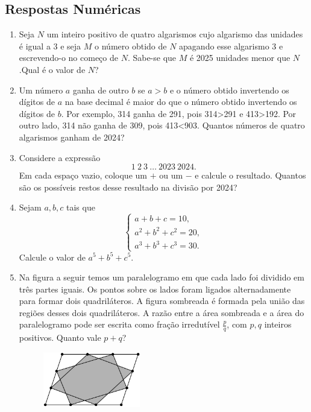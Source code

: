 \documentclass[12pt]{article}
\begin{document}
    \subsection{Respostas Numéricas}
      \begin{enumerate}[label=\textbf{\arabic*.}, start=16]
        \item Seja \(N\) um inteiro positivo de quatro algarismos cujo algarismo das unidades é igual a 3 e seja \(M\) o número obtido de
          \(N\) apagando esse algarismo 3 e escrevendo-o no começo de \(N\). Sabe-se que \(M\) é 2025 unidades menor que \(N\).Qual é o valor
          de \(N\)?
        \item Um número \(a\) ganha de outro \(b\) se \(a>b\) e o número obtido invertendo os dígitos de \(a\) na base decimal é maior do que
          o número obtido invertendo os dígitos de \(b\). Por exemplo, 314 ganha de 291, pois 314>291 e 413>192. Por outro lado, 314 não ganha
          de 309, pois 413<903. Quantos números de quatro algarismos ganham de 2024?
        \item Considere a expressão
          \[
            1\ 2\ 3\ \ldots\ 2023\ 2024.
          \]
          Em cada espaço vazio, coloque um \(+\) ou um \(-\) e calcule o resultado. Quantos são os possíveis restos desse resultado na
          divisão por 2024?
        \item Sejam \(a,b,c\) tais que
          \[
            \begin{cases}
              a+b+c=10,\\
              a^2+b^2+c^2=20,\\
              a^3+b^3+c^3=30.
            \end{cases}
          \]
          Calcule o valor de \(a^5+b^5+c^5\).
        \item Na figura a seguir temos um paralelogramo em que cada lado foi dividido em três partes iguais. Os pontos sobre os lados foram
          ligados alternadamente para formar dois quadriláteros. A figura sombreada é formada pela união das regiões desses dois quadriláteros.
          A razão entre a área sombreada e a área do paralelogramo pode ser escrita como fração irredutível \(\tfrac{p}{q}\), com \(p,q\)
          inteiros positivos. Quanto vale \(p+q\)?
          \begin{figure}[h]
            \centering
            \includegraphics[width=0.4\textwidth]{sixth.png}
          \end{figure}
      \end{enumerate}
  \clearpage
\end{document}
